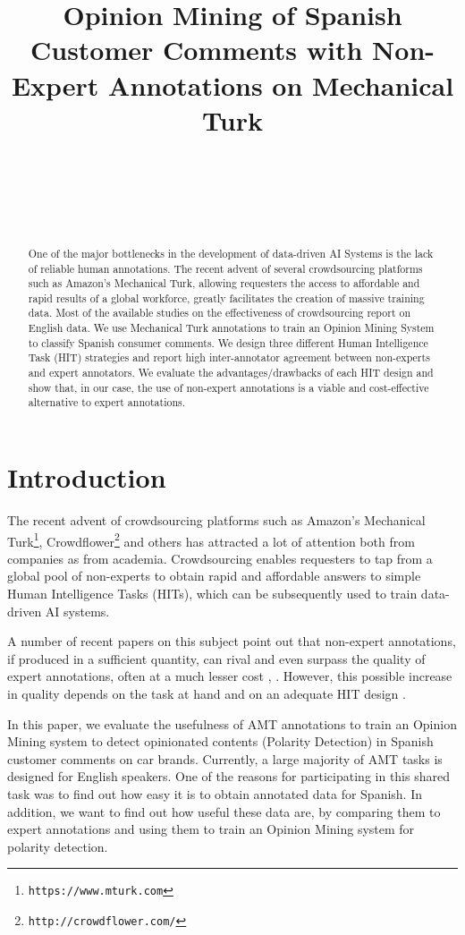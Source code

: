 \documentclass[11pt,letterpaper]{article}
\title{Opinion Mining of Spanish Customer Comments with Non-Expert Annotations on Mechanical Turk}
\author{\\
  \\
  \\
  \\
  }
\date{}
\begin{document}
\maketitle
\begin{abstract}
  One of the major bottlenecks in the development of data-driven AI Systems is the lack of reliable human annotations. The recent advent of several crowdsourcing platforms such as Amazon's Mechanical Turk, allowing requesters the access to affordable and rapid results of a global workforce, greatly facilitates the creation of massive training data. Most of the available studies on the effectiveness of crowdsourcing report on English data. We use Mechanical Turk annotations to train an Opinion Mining System to classify Spanish consumer comments. We design three different Human Intelligence Task (HIT) strategies and report high inter-annotator agreement between non-experts and expert annotators. We evaluate the advantages/drawbacks of each HIT design and show that, in our case, the use of non-expert annotations is a viable and cost-effective alternative to expert annotations.
\end{abstract}

\section{Introduction}
\label{sect:intro}

The recent advent of crowdsourcing platforms such as Amazon's Mechanical Turk\footnote{\texttt{https://www.mturk.com}}, Crowdflower\footnote{\texttt{http://crowdflower.com/}} and others has attracted a lot of attention both from companies as from academia. Crowdsourcing enables requesters to tap from a global pool of non-experts to obtain rapid and affordable answers to simple Human Intelligence Tasks (HITs), which can be subsequently used to train data-driven AI systems.

A number of recent papers on this subject point out that non-expert annotations, if produced in a sufficient quantity, can rival and even surpass the quality of expert annotations, often at a much lesser cost \cite{snow_cheap_2008}, \cite{su_internet-scale_2007}. However, this possible increase in quality depends on the task at hand and on an adequate HIT design \cite{kittur_crowdsourcing_2008}.

In this paper, we evaluate the usefulness of AMT annotations to train an Opinion Mining system to detect opinionated contents (Polarity Detection) in Spanish customer comments on car brands. Currently, a large majority of AMT tasks is designed for English speakers. One of the reasons for participating in this shared task was to find out how easy it is to obtain annotated data for Spanish. In addition, we want to find out how useful these data are, by comparing them to expert annotations and using them to train an Opinion Mining system for polarity detection.
\end{document}
